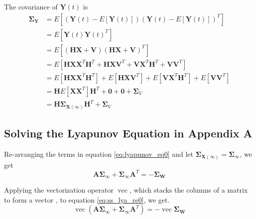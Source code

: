 \documentclass{article}
\begin{document}
The covariance of $\mathbf{Y}(t)$ is
\begin{equation}
\begin{aligned}
\mathbf{\Sigma_Y} &= E \left[ \left( \mathbf{Y}(t)-E[\mathbf{Y}(t)] \right) \left( \mathbf{Y}(t)-E[\mathbf{Y}(t)] \right)^T \right] \\
&=E \left[ \mathbf{Y}(t) \mathbf{Y}(t)^T \right] \\
&=E \left[ \left( \mathbf{H}\mathbf{X}+\mathbf{V} \right) \left( \mathbf{H}\mathbf{X}+\mathbf{V} \right)^T \right] \\
&=E \left[ \mathbf{H} \mathbf{X} \mathbf{X}^T \mathbf{H}^T + \mathbf{H} \mathbf{X} \mathbf{V}^T + \mathbf{V} \mathbf{X}^T \mathbf{H}^T +\mathbf{V} \mathbf{V}^T \right] \\
&= E \left[ \mathbf{H} \mathbf{X} \mathbf{X}^T \mathbf{H}^T \right] + E \left[ \mathbf{H} \mathbf{X} \mathbf{V}^T \right] + E \left [ \mathbf{V} \mathbf{X}^T \mathbf{H}^T \right] + E \left [\mathbf{V} \mathbf{V}^T \right] \\
&= \mathbf{H} E \left [\mathbf{X} \mathbf{X}^T \right ] \mathbf{H}^T + \mathbf{0} + \mathbf{0} + \mathbf{\Sigma}_V \\
&= \mathbf{H} \mathbf{\Sigma}_{\mathbf{X}(\infty)} \mathbf{H}^T + \mathbf{\Sigma}_V
\end{aligned}
\label{eq:cov_yt}
\end{equation}

\subsection*{Solving the Lyapunov Equation in Appendix A}

Re-arranging the terms in equation \ref{eq:lyapunov_eq0} and let $\mathbf{\Sigma}_{\mathbf{X}(\infty)}=\mathbf{\Sigma}_{\infty}$, we get
\begin{equation}
\mathbf{A} \mathbf{\Sigma}_\mathbf{\infty} +\mathbf{\Sigma}_\mathbf{\infty} \mathbf{A}^T=-\mathbf{\Sigma}_\mathbf{W}
\label{eq:ss_lya_re0}
\end{equation}


Applying the vectorization operator $\operatorname{vec}$, which stacks the columns of a matrix to form a vector \citep{MagnusNeudecker1999}, to equation \ref{eq:ss_lya_re0}, we get.
\begin{equation}
\operatorname{vec}(\mathbf{A} \mathbf{\Sigma}_\mathbf{\infty} +\mathbf{\Sigma}_\mathbf{\infty} \mathbf{A}^T)=-\operatorname{vec} \mathbf{\Sigma}_\mathbf{W}
\label{eq:ss_ly_re1}
\end{equation}
\end{document}
